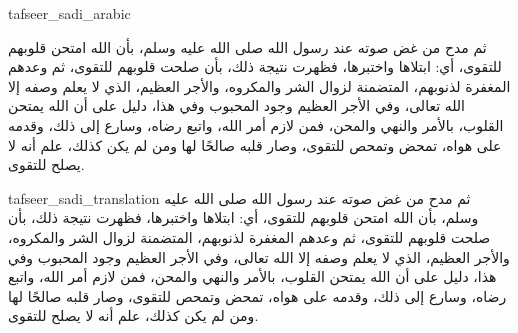 \begin{taggedblock}{tafseer_sadi_arabic}
\begin{Arabic}
ثم مدح من غض صوته عند رسول الله صلى الله عليه وسلم، بأن الله امتحن قلوبهم للتقوى، أي: ابتلاها واختبرها، فظهرت نتيجة ذلك، بأن صلحت قلوبهم للتقوى، ثم وعدهم المغفرة لذنوبهم، المتضمنة لزوال الشر والمكروه، والأجر العظيم، الذي لا يعلم وصفه إلا الله تعالى، وفي الأجر العظيم وجود المحبوب  وفي هذا، دليل على أن الله يمتحن القلوب، بالأمر والنهي والمحن، فمن لازم أمر الله، واتبع رضاه، وسارع إلى ذلك، وقدمه على هواه، تمحض وتمحص للتقوى، وصار قلبه صالحًا لها ومن لم يكن كذلك، علم أنه لا يصلح للتقوى.
\end{Arabic}
\end{taggedblock}
\begin{taggedblock}{tafseer_sadi_translation}
ثم مدح من غض صوته عند رسول الله صلى الله عليه وسلم، بأن الله امتحن قلوبهم للتقوى، أي: ابتلاها واختبرها، فظهرت نتيجة ذلك، بأن صلحت قلوبهم للتقوى، ثم وعدهم المغفرة لذنوبهم، المتضمنة لزوال الشر والمكروه، والأجر العظيم، الذي لا يعلم وصفه إلا الله تعالى، وفي الأجر العظيم وجود المحبوب  وفي هذا، دليل على أن الله يمتحن القلوب، بالأمر والنهي والمحن، فمن لازم أمر الله، واتبع رضاه، وسارع إلى ذلك، وقدمه على هواه، تمحض وتمحص للتقوى، وصار قلبه صالحًا لها ومن لم يكن كذلك، علم أنه لا يصلح للتقوى.
\end{taggedblock}

\begin{comment}
Please use the following for footnotes:- Sample\footnoteQ{Text of Qur'an footnote goes here.}.
Sample\footnoteT{Text of Tafseer footnote goes here.}.
\end{comment}